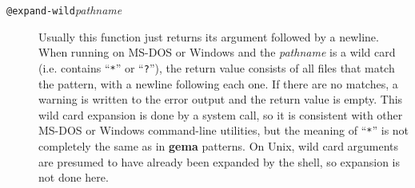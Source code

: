 \begin{description}
\item[{\tt @expand-wild\ttlb}{\it pathname}{\tt \ttrb}]
Usually this function just returns its argument followed by a newline.
When running on MS-DOS or Windows
and the {\it pathname} is a wild card (i.e. contains
``\verb/*/'' or ``\verb/?/''), the return value consists of all files
that match the pattern, with a newline following each one.  If there are
no matches, a warning is written to the error output and the return value
is empty.  This wild card expansion is done by a system call, so it
is consistent with other MS-DOS or Windows command-line utilities, but the
meaning of ``\verb/*/''
is not completely the same as in {\bf gema} patterns.
On Unix, wild card arguments are presumed to have already been expanded by
the shell, so expansion is not done here.

\end{description}

